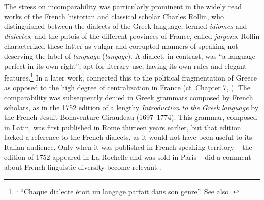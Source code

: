 \documentclass[output=paper]{langsci/langscibook}
\begin{document}
The stress on incomparability was particularly prominent in the widely read works of the French historian and classical scholar Charles Rollin, who distinguished between the dialects of the Greek language, termed \textit{idiomes} and \textit{dialectes}, and the patois of the different provinces of France, called \textit{jargons}. Rollin characterized these latter as vulgar and corrupted manners of speaking not deserving the label of \textit{language} (\textit{langage}). A dialect, in contrast, was “a language perfect in its own right”, apt for literary use, having its own rules and elegant features.\footnote{\citet[117]{Rollin1726}: “Chaque dialecte étoit un langage parfait dans son genre”. See also \citet[395]{Rollin1731}.} In a later work, \citet[395]{Rollin1731} connected this to the political fragmentation of Greece as opposed to the high degree of centralization in France (cf. Chapter 7, ). The comparability was subsequently denied in Greek grammars composed by French scholars, as in the 1752 edition of a lengthy \textit{Introduction} \textit{to} \textit{the} \textit{Greek} \textit{language} by the French Jesuit Bonaventure Giraudeau (1697–1774). This grammar, composed in Latin, was first published in Rome thirteen years earlier, but that edition lacked a reference to the French dialects, as it would not have been useful to its Italian audience. Only when it was published in French-speaking territory – the edition of 1752 appeared in La Rochelle and was sold in Paris – did a comment about French linguistic diversity become relevant \citep[117]{Giraudeau1752}.
\end{document}
